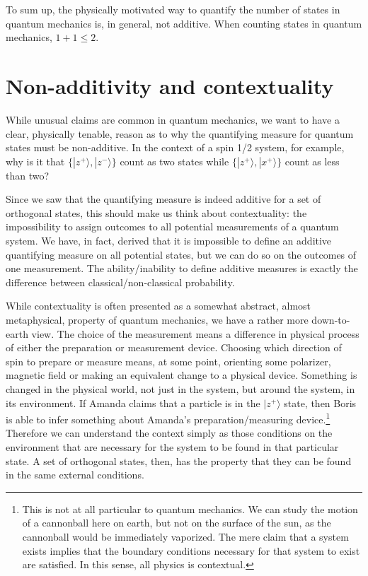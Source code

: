 \documentclass[10pt,twocolumn, nofootinbib]{revtex4-2}
\def\>{\rangle}
\begin{document}
To sum up, the physically motivated way to quantify the number of states in quantum mechanics is, in general, not additive. When counting states in quantum mechanics, $1+1 \leq 2$.

\section{Non-additivity and contextuality}

While unusual claims are common in quantum mechanics, we want to have a clear, physically tenable, reason as to why the quantifying measure for quantum states must be non-additive. In the context of a spin 1/2 system, for example, why is it that $\{ |z^+\>, |z^-\>\}$ count as two states while $\{ |z^+\>, |x^+\> \}$ count as less than two?

Since we saw that the quantifying measure is indeed additive for a set of orthogonal states, this should make us think about contextuality: the impossibility to assign outcomes to all potential measurements of a quantum system. We have, in fact, derived that it is impossible to define an additive quantifying measure on all potential states, but we can do so on the outcomes of one measurement. The ability/inability to define additive measures is exactly the difference between classical/non-classical probability.

While contextuality is often presented as a somewhat abstract, almost metaphysical, property of quantum mechanics, we have a rather more down-to-earth view. The choice of the measurement means a difference in physical process of either the preparation or measurement device. Choosing which direction of spin to prepare or measure means, at some point, orienting some polarizer, magnetic field or making an equivalent change to a physical device. Something is changed in the physical world, not just in the system, but around the system, in its environment. If Amanda claims that a particle is in the $|z^+\>$ state, then Boris is able to infer something about Amanda's preparation/measuring device.\footnote{This is not at all particular to quantum mechanics. We can study the motion of a cannonball here on earth, but not on the surface of the sun, as the cannonball would be immediately vaporized. The mere claim that a system exists implies that the boundary conditions necessary for that system to exist are satisfied. In this sense, all physics is contextual.} Therefore we can understand the context simply as those conditions on the environment that are necessary for the system to be found in that particular state. A set of orthogonal states, then, has the property that they can be found in the same external conditions.
\end{document}
